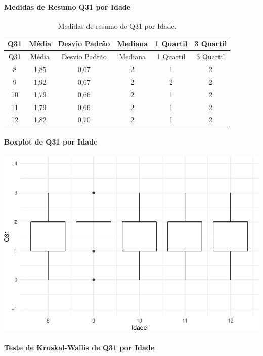 \documentclass[]{article}
\let\oldparagraph\paragraph
\renewcommand{\paragraph}[1]{\oldparagraph{#1}\mbox{}}
\begin{document}
\cleardoublepage

\hypertarget{medidas-de-resumo-q31-por-idade}{%
\paragraph{Medidas de Resumo Q31 por Idade}\label{medidas-de-resumo-q31-por-idade}}

\begin{longtable}[]{@{}cccccc@{}}
\caption{\label{tab:unnamed-chunk-1039}Medidas de resumo de Q31 por Idade.}\tabularnewline
\toprule
Q31 & Média & Desvio Padrão & Mediana & 1 Quartil & 3 Quartil\tabularnewline
\midrule
\endfirsthead
\toprule
Q31 & Média & Desvio Padrão & Mediana & 1 Quartil & 3 Quartil\tabularnewline
\midrule
\endhead
8 & 1,85 & 0,67 & 2 & 1 & 2\tabularnewline
9 & 1,92 & 0,67 & 2 & 2 & 2\tabularnewline
10 & 1,79 & 0,66 & 2 & 1 & 2\tabularnewline
11 & 1,79 & 0,66 & 2 & 1 & 2\tabularnewline
12 & 1,82 & 0,70 & 2 & 1 & 2\tabularnewline
\bottomrule
\end{longtable}

\hypertarget{boxplot-de-q31-por-idade}{%
\paragraph{Boxplot de Q31 por Idade}\label{boxplot-de-q31-por-idade}}

\begin{center}\includegraphics[width=0.75\linewidth]{relatorio_covid19_files/figure-latex/unnamed-chunk-1040-1} \end{center}

\hypertarget{teste-de-kruskal-wallis-de-q31-por-idade}{%
\paragraph{Teste de Kruskal-Wallis de Q31 por Idade}\label{teste-de-kruskal-wallis-de-q31-por-idade}}
\end{document}
